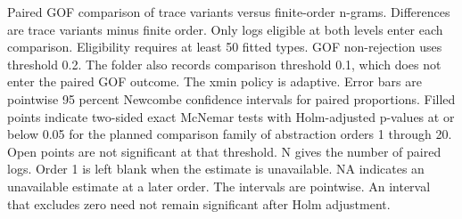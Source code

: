 Paired GOF comparison of trace variants versus finite-order n-grams. Differences are trace variants minus finite order. Only logs eligible at both levels enter each comparison. Eligibility requires at least 50 fitted types. GOF non-rejection uses threshold 0.2. The folder also records comparison threshold 0.1, which does not enter the paired GOF outcome. The xmin policy is adaptive. Error bars are pointwise 95 percent Newcombe confidence intervals for paired proportions. Filled points indicate two-sided exact McNemar tests with Holm-adjusted p-values at or below 0.05 for the planned comparison family of abstraction orders 1 through 20. Open points are not significant at that threshold. N gives the number of paired logs. Order 1 is left blank when the estimate is unavailable. NA indicates an unavailable estimate at a later order. The intervals are pointwise. An interval that excludes zero need not remain significant after Holm adjustment.
